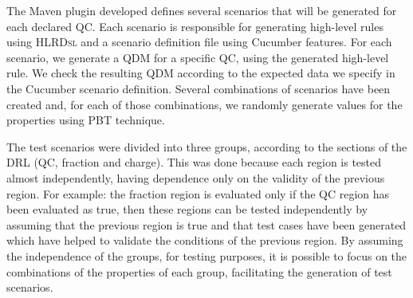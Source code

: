 \documentclass[AMA,STIX1COL]{WileyNJD-v2}
\newcommand{\hlrdsl}{\textsc{HLRDsl}\xspace}
\begin{document}

The Maven plugin developed defines several scenarios that will be generated for each declared QC. Each scenario is responsible for generating high-level rules using \hlrdsl and a scenario definition file using Cucumber features. For each scenario, we generate a QDM for a specific QC, using the generated high-level rule.
We check the resulting QDM according to the expected data we specify in the Cucumber scenario definition. Several combinations of scenarios have been created and, for each of those combinations, we randomly generate values for the properties using PBT technique.


The test scenarios were divided into three groups, according to the sections of the DRL (QC, fraction and charge). This was done because each region is tested almost independently, having dependence only on the validity of the previous region. For example: the fraction region is evaluated only if the QC region has been evaluated as true, then these regions can be tested independently by assuming that the previous region is true and that test cases have been generated which have helped to validate the conditions of the previous region. By assuming the independence of the groups, for testing purposes, it is possible to focus on the combinations of the properties of each group, facilitating the generation of test scenarios.
\end{document}
